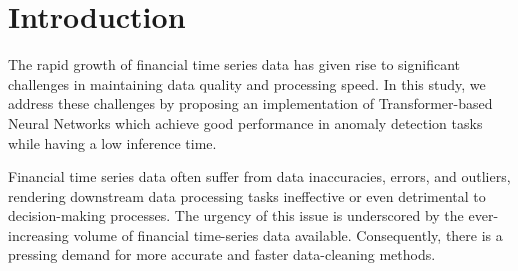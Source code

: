 \documentclass[a4paper, twoside]{report}
\theoremstyle{definition}
\newtheorem{remark}[theorem]{Remark}
\numberwithin{equation}{section}
\begin{document}




\chapter*{Introduction}



The rapid growth of financial time series data has given rise to significant
challenges in maintaining data quality and processing speed. In this study, we address
these challenges by proposing an implementation of Transformer-based Neural Networks
which achieve good performance in anomaly detection tasks while having
a low inference time.

Financial time series data often suffer from data inaccuracies, errors, and
outliers, rendering downstream data processing tasks ineffective or even detrimental to
decision-making processes. The urgency of this issue is underscored by the ever-increasing
volume of financial time-series data available. Consequently, there is a pressing
demand for more accurate and faster data-cleaning methods.
\end{document}
